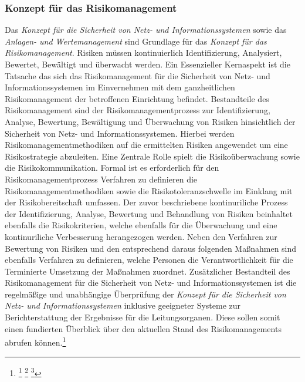 \documentclass[11pt,a4paper,hidelinks]{article}   %
\begin{document}
            \subsubsection{Konzept für das Risikomanagement}
            Das \emph{Konzept für die Sicherheit von Netz- und Informationssystemen} sowie das \emph{Anlagen- und Wertemanagement} sind Grundlage für das \emph{Konzept für das Risikomanagement}. Risiken müssen kontinuierlich Identifizierung, Analysiert, Bewertet, Bewältigt und überwacht werden. Ein Essenzieller Kernaspekt ist die Tatsache das sich das Risikomanagement für die Sicherheit von Netz- und Informationssystemen im Einvernehmen mit dem ganzheitlichen Risikomanagement der betroffenen Einrichtung befindet. Bestandteile des Risikomanagement sind der Risikomanagementprozess zur Identifizierung, Analyse, Bewertung, Bewältigung und Überwachung von Risiken hinsichtlich der Sicherheit von Netz- und Informationssystemen. Hierbei werden Risikomanagementmethodiken auf die ermittelten Risiken angewendet um eine Risikostrategie abzuleiten. Eine Zentrale Rolle spielt die Risikoüberwachung sowie die Risikokommunikation. Formal ist es erforderlich für den Risikomanagementprozess Verfahren zu definieren die Risikomanagementmethodiken sowie die Risikotoleranzschwelle im Einklang mit der Risikobereitschaft umfassen. Der zuvor beschriebene kontinuriliche Prozess der Identifizierung, Analyse, Bewertung und Behandlung von Risiken beinhaltet ebenfalls die Risikokriterien, welche ebenfalls für die Überwachung und eine kontinuriliche Verbesserung herangezogen werden. Neben den Verfahren zur Bewertung von Risiken und den entsprechend daraus folgenden Maßnahmen sind ebenfalls Verfahren zu definieren, welche Personen die Verantwortlichkeit für die Terminierte Umsetzung der Maßnahmen zuordnet. Zusätzlicher Bestandteil des Risikomanagement für die Sicherheit von Netz- und Informationssystemen ist die regelmäßige und unabhängige Überprüfung der \emph{Konzept für die Sicherheit von Netz- und Informationssystemen} inklusive geeigneter Systeme zur Berichterstattung der Ergebnisse für die Leitungsorganen. Diese sollen somit einen fundierten Überblick über den aktuellen Stand des Risikomanagements abrufen können.\footnote{
                \footcite[Vgl. Nummer 2,][, Anhang]{EU2024-2690}
                \footcite[Risikomanagement in Unternehmen allgegenwärtig][]{MISSING}  
                \footcite[Vgl. §30 Absatz 1 und Absatz 2, Nummer 1,][]{NIS2UmsuCG}              
            }
\end{document}
